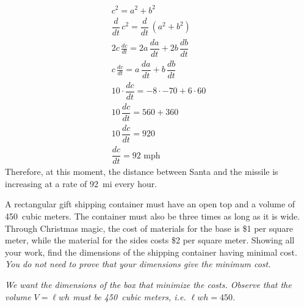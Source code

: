 \documentclass[12pt,letterpaper]{exam}
\begin{document}
\begin{questions}
{	\[
	\begin{gathered}
	c^2= a^2 + b^2 \\[0.1cm]
	\dfrac{d}{dt} \, c^2= \dfrac{d}{dt} \, (a^2 + b^2) \\[0.1cm]
	2c \, \frac{dc}{dt}= 2a \, \dfrac{da}{dt} + 2b \, \dfrac{db}{dt} \\[0.1cm]
	c \, \frac{dc}{dt}= a \, \dfrac{da}{dt} + b \, \dfrac{db}{dt} \\[0.1cm]
	10 \cdot \dfrac{dc}{dt}= -8 \cdot -70 + 6 \cdot 60 \\[0.1cm]
	10 \, \dfrac{dc}{dt}= 560 + 360 \\[0.1cm]
	10 \, \dfrac{dc}{dt}= 920 \\[0.1cm]
	\dfrac{dc}{dt}= 92 \text{ mph}
	\end{gathered}
	\]
Therefore, at this moment, the distance between Santa and the missile is increasing at a rate of 92~mi every hour. 
}



\newpage
{} \par\vspace{0.3cm}

A rectangular gift shipping container must have an open top and a volume of 450~cubic meters. The container must also be three times as long as it is wide. Through Christmas magic, the cost of materials for the base is \$1 per square meter, while the material for the sides costs \$2 per square meter. Showing all your work, find the dimensions of the shipping container having minimal cost. {\itshape You do not need to prove that your dimensions give the minimum cost.} \pspace

{\small\itshape \tsol We want the dimensions of the box that minimize the costs. Observe that the volume $V= \ell w h$ must be 450~cubic meters, i.e. $\ell w h= 450$. 

}
\end{questions}
\end{document}
